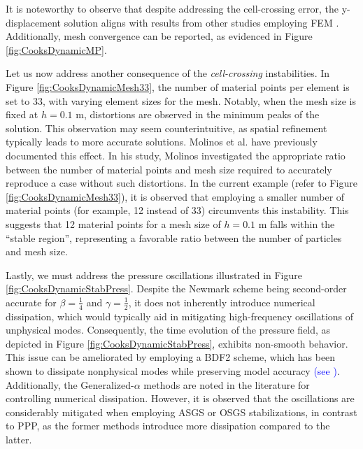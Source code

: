 \documentclass[11pt,english]{article}
\newcommand{\LM}[1]{\textcolor{blue}{#1}}
\begin{document}
	It is noteworthy to observe that despite addressing the cell-crossing error, the y-displacement solution aligns with results from other studies employing FEM \cite{rossi2016implicit,castanar2020stabilized}. Additionally, mesh convergence can be reported, as evidenced in Figure \ref{fig:CooksDynamicMP}.
          
       
        Let us now address another consequence of the \textit{cell-crossing} instabilities. In Figure \ref{fig:CooksDynamicMesh33}, the number of material points per element is set to 33, with varying element sizes for the mesh. Notably, when the mesh size is fixed at $h=0.1$ m, distortions are observed in the minimum peaks of the solution. This observation may seem counterintuitive, as spatial refinement typically leads to more accurate solutions. Molinos et al. \cite{molinos2021} have previously documented this effect. In his study, Molinos investigated the appropriate ratio between the number of material points and mesh size required to accurately reproduce a case without such distortions. In the current example (refer to Figure \ref{fig:CooksDynamicMesh33}), it is observed that employing a smaller number of material points (for example, 12 instead of 33) circumvents this instability. This suggests that 12 material points for a mesh size of $h=0.1$ m falls within the ``stable region'', representing a favorable ratio between the number of particles and mesh size.
      
     
    Lastly, we must address the pressure oscillations illustrated in Figure \ref{fig:CooksDynamicStabPress}. Despite the Newmark scheme being second-order accurate for $\beta=\frac{1}{4}$ and $\gamma=\frac{1}{2}$, it does not inherently introduce numerical dissipation, which would typically aid in mitigating high-frequency oscillations of unphysical modes. Consequently, the time evolution of the pressure field, as depicted in Figure \ref{fig:CooksDynamicStabPress}, exhibits non-smooth behavior. This issue can be ameliorated by employing a BDF2 scheme, which has been shown to dissipate nonphysical modes while preserving model accuracy \LM{(see \cite{castanar2020stabilized})}. Additionally, the Generalized-$\alpha$ methods \cite{chung1993time} are noted in the literature for controlling numerical dissipation. However, it is observed that the oscillations are considerably mitigated when employing ASGS or OSGS stabilizations, in contrast to PPP, as the former methods introduce more dissipation compared to the latter.
    
%
%
\end{document}
